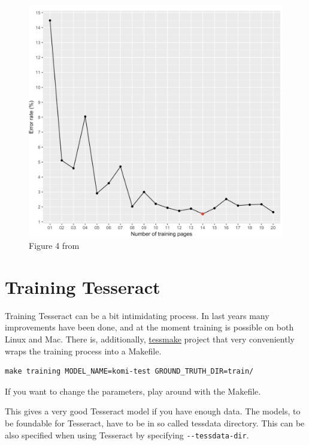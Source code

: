\documentclass[]{book}
\begin{document}
\begin{figure}
\centering
\includegraphics{images/ocropy_training_scores.jpg}
\caption{Figure 4 from \citet{partanen2019ocr}}
\end{figure}

\hypertarget{training-tesseract}{%
\section{Training Tesseract}\label{training-tesseract}}

Training Tesseract can be a bit intimidating process. In last years many improvements have been done, and at the moment training is possible on both Linux and Mac. There is, additionally, \href{https://github.com/tesseract-ocr/tesstrain}{tessmake} project that very conveniently wraps the training process into a Makefile.

\begin{verbatim}
make training MODEL_NAME=komi-test GROUND_TRUTH_DIR=train/
\end{verbatim}

If you want to change the parameters, play around with the Makefile.

This gives a very good Tesseract model if you have enough data. The models, to be foundable for Tesseract, have to be in so called tessdata directory. This can be also specified when using Tesseract by specifying \texttt{-\/-tessdata-dir}.
\end{document}
